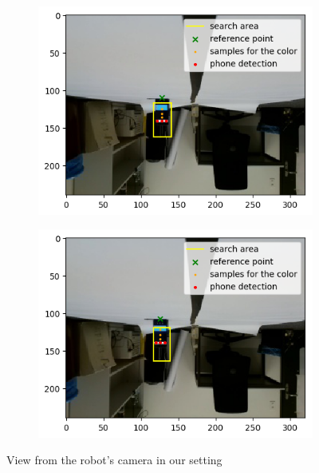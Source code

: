 \documentclass[14pt,a4paper]{article}
\theoremstyle{definition}
\begin{document}
\begin{figure}[h]
        \begin{subfigure}[b]{0.49\textwidth}   
            \centering 
            \includegraphics[width=\textwidth]{img/vue46.png}
   
            \label{fig:mean and std of net34}
        \end{subfigure}
        \begin{subfigure}[b]{0.49\textwidth}   
            \centering 
            \includegraphics[width=\textwidth]{img/vue51.png}
  
            \label{fig:mean and std of net44}
        \end{subfigure}
        \caption{{\small View from the robot's camera in our setting}}
	\label{vue_robot}
\end{figure}
\end{document}
